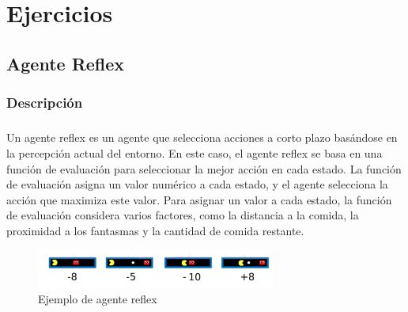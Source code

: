 \documentclass{report}
\begin{document}
    \chapter{Ejercicios}
      \section{Agente Reflex}
        \subsection*{Descripción}
          \paragraph*{}{
            Un agente reflex es un agente que selecciona acciones a corto plazo basándose en la percepción actual del entorno. 
            En este caso, el agente reflex se basa en una función de evaluación para seleccionar la mejor acción en cada estado. 
            La función de evaluación asigna un valor numérico a cada estado, y el agente selecciona la acción que maximiza este valor.
            Para asignar un valor a cada estado, la función de evaluación considera varios factores, como la distancia a la comida, la proximidad a los fantasmas y la cantidad de comida restante.
            \begin{figure}[H]
                \centering
                \includegraphics[width=0.7\textwidth]{./.img/reflex.png}
                \caption{Ejemplo de agente reflex}
            \end{figure}  
        }
\end{document}
